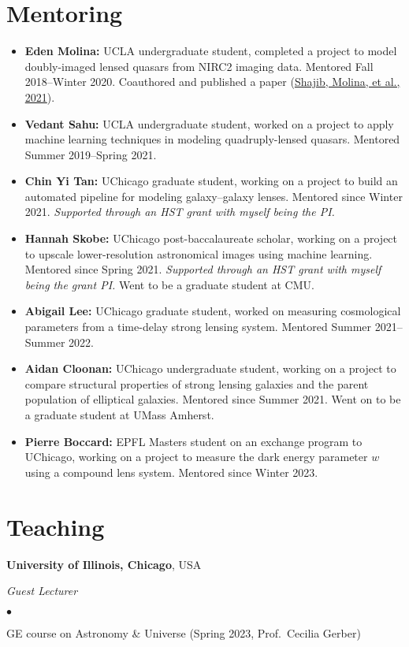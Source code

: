 \documentclass[margin, line]{res}
\newenvironment{list2}{
  \begin{list}{$\bullet$}{%
      \setlength{\itemsep}{0in}
      \setlength{\parsep}{0in} \setlength{\parskip}{0in}
      \setlength{\topsep}{0in} \setlength{\partopsep}{0in} 
      \setlength{\leftmargin}{0.2in}}}{\end{list}}
\begin{document}
\begin{resume}
\section{\sc Mentoring}
\begin{itemize}
	\item \textbf{Eden Molina:} UCLA undergraduate student, completed a project to model doubly-imaged lensed quasars from NIRC2 imaging data. Mentored Fall 2018--Winter 2020. Coauthored and published a paper (\href{https://doi:10.1093/mnras/stab532}{Shajib, Molina, et al., 2021}).
	\item \textbf{Vedant Sahu:} UCLA undergraduate student, worked on a project to apply machine learning techniques in modeling quadruply-lensed quasars. Mentored Summer 2019--Spring 2021.
	\item \textbf{Chin Yi Tan:} UChicago graduate student, working on a project to build an automated pipeline for modeling galaxy--galaxy lenses. Mentored since Winter 2021. \textit{Supported through an \textsc{HST} grant with myself being the PI.}
	\item \textbf{Hannah Skobe:} UChicago post-baccalaureate scholar, working on a project to upscale lower-resolution astronomical images using machine learning. Mentored since Spring 2021. \textit{Supported through an HST grant with myself being the grant PI.} Went to be a graduate student at CMU.
	\item \textbf{Abigail Lee:} UChicago graduate student, worked on measuring cosmological parameters from a time-delay strong lensing system. Mentored Summer 2021--Summer 2022.
	\item \textbf{Aidan Cloonan:} UChicago undergraduate student, working on a project to compare structural properties of strong lensing galaxies and the parent population of elliptical galaxies. Mentored since Summer 2021. Went on to be a graduate student at UMass Amherst.
	\item \textbf{Pierre Boccard:} EPFL Masters student on an exchange program to UChicago, working on a project to measure the dark energy parameter $w$ using a compound lens system. Mentored since Winter 2023.
\end{itemize}


\section{\sc Teaching}

{\bf University of Illinois, Chicago}, USA

{\em Guest Lecturer} \hfill {\bf}\\
\begin{list2}
	\item GE course on Astronomy \& Universe (Spring 2023, Prof.~Cecilia Gerber)
\end{list2}


\end{resume}
\end{document}
